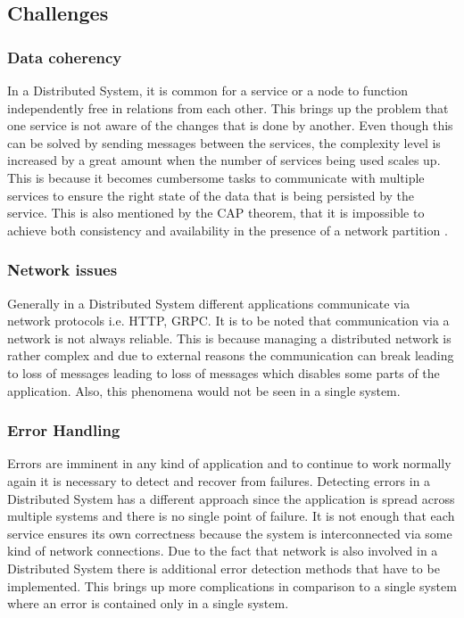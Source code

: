     \subsection{Challenges}    
        \label{subsection: distriChallenges}
        \subsubsection{Data coherency}
        In a Distributed System, it is common for a service or a node to function independently free in relations from each other. This brings up the problem that
        one service is not aware of the changes that is done by another. Even though this can be solved by sending messages between the services, the complexity
        level is increased by a great amount when the number of services being used scales up. This is because it becomes cumbersome tasks to communicate with
        multiple services to ensure the right state of the data that is being persisted by the service. This is also mentioned by the CAP theorem, that it is
        impossible to achieve both consistency and availability in the presence of a network partition \cite[p.~59]{CAP}.

        \subsubsection{Network issues}
        Generally in a Distributed System different applications communicate via network protocols i.e. HTTP, GRPC. It is to be noted that
        communication via a network is not always reliable. This is because managing a distributed network is rather complex and due to
        external reasons the communication can break leading to loss of messages leading to loss of messages which disables some parts of the application. 
        Also, this phenomena would not be seen in a single system.

        \subsubsection{Error Handling}
        Errors are imminent in any kind of application and to continue to work normally again it is necessary to detect and recover from failures.
        Detecting errors in a Distributed System has a different approach since the application is spread across multiple systems and there is no 
        single point of failure. It is not enough that each service ensures its own correctness because the system is interconnected via some kind of
        network connections. Due to the fact that network is also involved in a Distributed System there is additional error detection methods that have
        to be implemented. This brings up more complications in comparison to a single system where an error is contained only in a single system.

         
